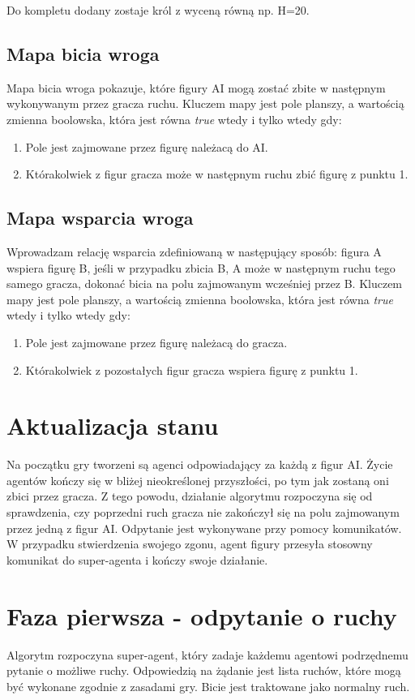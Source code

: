 \documentclass[a4paper,12pt,oneside,notitlepage,onecolumn]{article}
\begin{document}
Do kompletu dodany zostaje król z wyceną równą np. H=20.

\subsection{Mapa bicia wroga}
Mapa bicia wroga pokazuje, które figury AI mogą zostać zbite w następnym wykonywanym przez gracza ruchu.
Kluczem mapy jest pole planszy, a wartością zmienna boolowska, która jest równa \emph{true} wtedy i tylko wtedy gdy:
\begin{enumerate}
 \item Pole jest zajmowane przez figurę należacą do AI.
 \item Którakolwiek z figur gracza może w następnym ruchu zbić figurę z punktu 1.
\end{enumerate}

\subsection{Mapa wsparcia wroga}
Wprowadzam relację wsparcia zdefiniowaną w następujący sposób: figura A wspiera figurę B, jeśli w przypadku zbicia B, A może w następnym ruchu tego samego gracza, dokonać bicia na polu zajmowanym wcześniej przez B.
Kluczem mapy jest pole planszy, a wartością zmienna boolowska, która jest równa \emph{true} wtedy i tylko wtedy gdy:
\begin{enumerate}
 \item Pole jest zajmowane przez figurę należacą do gracza.
 \item Którakolwiek z pozostałych figur gracza wspiera figurę z punktu 1.
\end{enumerate}

\section{Aktualizacja stanu}
Na początku gry tworzeni są agenci odpowiadający za każdą z figur AI.
Życie agentów kończy się w bliżej nieokreślonej przyszłości, po tym jak zostaną oni zbici przez gracza.
Z tego powodu, działanie algorytmu rozpoczyna się od sprawdzenia, czy poprzedni ruch gracza nie zakończył się na polu zajmowanym przez jedną z figur AI.
Odpytanie jest wykonywane przy pomocy komunikatów.
W przypadku stwierdzenia swojego zgonu, agent figury przesyła stosowny komunikat do super-agenta i kończy swoje działanie.

\section{Faza pierwsza - odpytanie o ruchy}
Algorytm rozpoczyna super-agent, który zadaje każdemu agentowi podrzędnemu pytanie o możliwe ruchy.
Odpowiedzią na żądanie jest lista ruchów, które mogą być wykonane zgodnie z zasadami gry.
Bicie jest traktowane jako normalny ruch.
\end{document}
